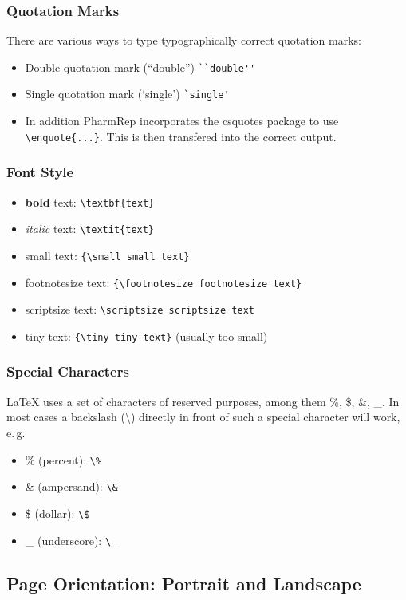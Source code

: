 \documentclass{pharmrep}
\newcommand{\PharmRep}{\textsf{PharmRep}\xspace}
\newcommand{\pkg}[1]{\textsf{#1}}
\newcommand{\eg}{e.\,g.\xspace}
\begin{document}
\subsubsection{Quotation Marks}
There are various ways to type typographically correct quotation marks:
\begin{itemize}
\item Double quotation mark (``double'') \verb|``double''|
\item Single quotation mark (`single') \verb|`single'|
   \item In addition \PharmRep incorporates the \pkg{csquotes} package to use
      \verb|\enquote{...}|. This is then transfered into the correct output.
\end{itemize}

\subsubsection{Font Style}
\begin{itemize}
\item \textbf{bold} text: \verb|\textbf{text}|
\item \textit{italic} text: \verb|\textit{text}|
\item {\small small text}: \verb|{\small small text}|
\item {\footnotesize footnotesize text}: \verb|{\footnotesize footnotesize text}|
\item {\scriptsize scriptsize text}: \verb|\scriptsize scriptsize text|
   \item {\tiny tiny text}: \verb|{\tiny tiny text}| (usually too small)
\end{itemize}

\subsubsection{Special Characters}
\LaTeX{} uses a set of characters of reserved purposes, among them \%, \$, \&, \_.
In most cases a backslash (\textbackslash) directly in front of such a special
character will work, \eg
\begin{itemize}
\item \% (percent): \verb|\%|
\item \& (ampersand): \verb|\&|
   \item \$ (dollar): \verb|\$|
   \item \_ (underscore): \verb|\_|
\end{itemize}

\subsection{Page Orientation: Portrait and Landscape}
\blindtext
\end{document}
